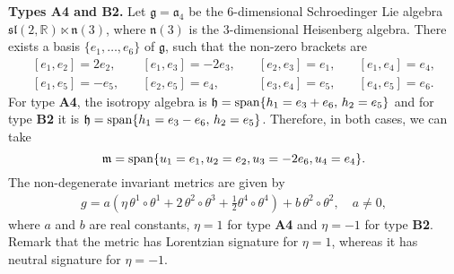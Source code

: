 \documentclass{amsart}
\theoremstyle{plain}
\theoremstyle{remark}
\def\R{\mathbb{R}}
\newcommand\A{{\mathfrak{a}}}
\newcommand\g{{\mathfrak{g}}}
\newcommand\h{{\mathfrak{h}}}
\newcommand\m{{\mathfrak{m}}}
\begin{document}

\medskip\noindent
{\bf Types A4 and B2.} Let $\g=\A _4$ be the $6$-dimensional Schroedinger Lie algebra  $\mathfrak{sl}(2,\R) \ltimes \mathfrak{n} (3)$, where $\mathfrak{n} (3)$ is the $3$-dimensional Heisenberg algebra. There exists a basis $\{e_1,\ldots,e_6\}$ of $\g$, such that the non-zero brackets are
\[
\begin{array}{llll}
[e_1,e_2]=2e_2, \quad & [e_1,e_3]=-2e_3, \quad & [e_2,e_3]=e_1, \quad & [e_1,e_4]=e_4, \\[2 pt]
[e_1,e_5]=-e_5, \quad & [e_2,e_5]=e_4, \quad  & [e_3,e_4]=e_5 , \quad & [e_4,e_5]=e_6.
\end{array}
\]
For type \textbf{A4}, the isotropy algebra is $\h={\rm span}\{h_1=e_3+e_6, \, h_2=e_5\}$ and for type \textbf{B2} it is $\h={\rm span}\{h_1={e_3 - e_6}, \, h_2={e_5}\}$. Therefore, in both cases, we can take
\begin{equation}\label{eq:mA4&B2}
\m={\rm span}\{u_1 = e_1, u_2 = e_2, u_3 = -2e_6, u_4 = e_4\}.
\end{equation}
The non-degenerate invariant metrics are given by
\begin{equation}\label{gA4}
\begin{array}{l} g=a \left(\eta \, \theta^1 \circ \theta^1+2 \, \theta^2 \circ \theta^3+\frac 12 \theta^4 \circ \theta ^4 \right)+b\, \theta^2 \circ \theta^2, \quad a \neq 0,
\end{array} \end{equation}
where $a$ and $b$ are real constants, $\eta = 1$ for type \textbf{A4} and $\eta = -1$ for type \textbf{B2}. Remark that the metric has Lorentzian signature for $\eta = 1$, whereas it has neutral signature for $\eta = -1$. %
\end{document}
